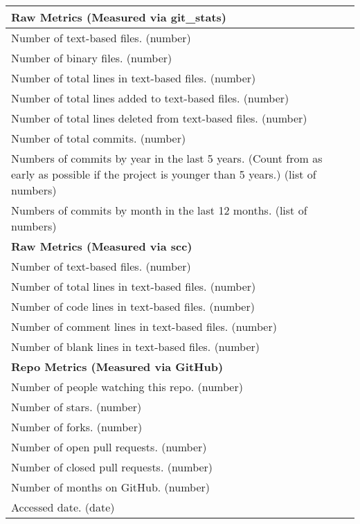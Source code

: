 \begin{table}[H]
\begin{tabular}{p{14cm}}
\hline
\textbf{Raw Metrics (Measured via git\_stats)}\\
\hline
Number of text-based files. (number)\\
Number of binary files. (number)\\
Number of total lines in text-based files. (number)\\
Number of total lines added to text-based files. (number)\\
Number of total lines deleted from text-based files. (number)\\
Number of total commits. (number)\\
Numbers of commits by year in the last 5 years. (Count from as early as possible if the project is younger than 5 years.) (list of numbers)\\
Numbers of commits by month in the last 12 months. (list of numbers)\\
\hline
\textbf{Raw Metrics (Measured via scc)}\\
\hline
Number of text-based files. (number)\\
Number of total lines in text-based files. (number)\\
Number of code lines in text-based files. (number)\\
Number of comment lines in text-based files. (number)\\
Number of blank lines in text-based files. (number)\\
\hline
\textbf{Repo Metrics (Measured via GitHub)}\\
\hline
Number of people watching this repo. (number)\\
Number of stars. (number)\\
Number of forks. (number)\\
Number of open pull requests. (number)\\
Number of closed pull requests. (number)\\
Number of months on GitHub. (number)\\
Accessed date. (date)\\
\hline
\end{tabular}
\end{table}
